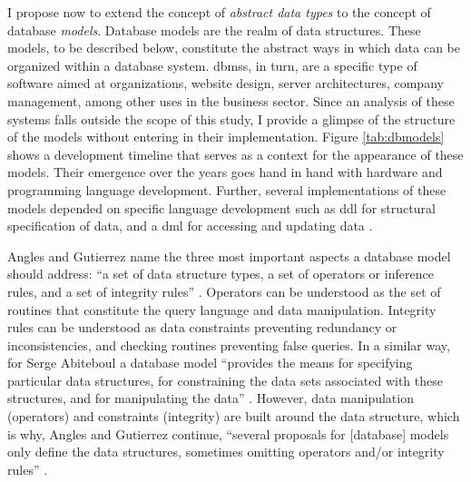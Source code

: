 I propose now to extend the concept of \textit{abstract data types} to the concept of database \textit{models}. Database models are the realm of data structures. These models, to be described below, constitute the abstract ways in which data can be organized within a database system. \gls{dbms}s, in turn, are a specific type of software aimed at organizations, website design, server architectures, company management, among other uses in the business sector. Since an analysis of these systems falls outside the scope of this study, I provide a glimpse of the structure of the models without entering in their implementation. Figure \ref{tab:dbmodels} shows a development timeline that serves as a context for the appearance of these models. Their emergence over the years goes hand in hand with hardware and programming language development. Further, several implementations of these models depended on specific language development such as \gls{ddl} for structural specification of data, and a \gls{dml} for accessing and updating data \parencite[4]{DBLP:books/aw/AbiteboulHV95}. 

Angles and Gutierrez name the three most important aspects a database model should address: ``a set of data structure types, a set of operators or inference rules, and a set of integrity rules'' \parencite[2]{2008:graph/anglesgutierrez/survey}. Operators can be understood as the set of routines that constitute the query language and data manipulation. Integrity rules can be understood as data constraints preventing redundancy or inconsistencies, and checking routines preventing false queries. In a similar way, for Serge Abiteboul a database model ``provides the means for specifying particular data structures, for constraining the data sets associated with these structures, and for manipulating the data'' \parencite[28]{DBLP:books/aw/AbiteboulHV95}. However, data manipulation (operators) and constraints (integrity) are built around the data structure, which is why, Angles and Gutierrez continue, ``several proposals for [database] models only define the data structures, sometimes omitting operators and/or integrity rules'' \parencite[2]{2008:graph/anglesgutierrez/survey}. 

